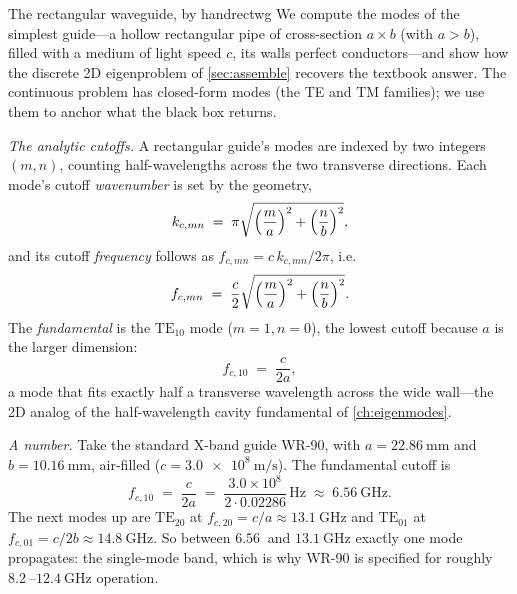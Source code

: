 \begin{workedexample}{The rectangular waveguide, by hand}{rectwg}
We compute the modes of the simplest guide---a hollow rectangular pipe of
cross-section $a\times b$ (with $a>b$), filled with a medium of light speed $c$,
its walls perfect conductors---and show how the discrete 2D eigenproblem of
\cref{sec:assemble} recovers the textbook answer. The continuous problem has
closed-form modes (the TE and TM families); we use them to anchor what the
black box returns.

\emph{The analytic cutoffs.} A rectangular guide's modes are indexed by two
integers $(m,n)$, counting half-wavelengths across the two transverse directions.
Each mode's cutoff \emph{wavenumber} is set by the geometry,
\[
  k_{c,mn} \;=\; \pi\sqrt{\Bigl(\frac{m}{a}\Bigr)^2 + \Bigl(\frac{n}{b}\Bigr)^2},
\]
and its cutoff \emph{frequency} follows as $f_{c,mn}=c\,k_{c,mn}/2\pi$, i.e.
\[
  f_{c,mn} \;=\; \frac{c}{2}\sqrt{\Bigl(\frac{m}{a}\Bigr)^2
                                 + \Bigl(\frac{n}{b}\Bigr)^2}.
\]
The \emph{fundamental} is the $\mathrm{TE}_{10}$ mode ($m=1,n=0$), the lowest
cutoff because $a$ is the larger dimension:
\[
  f_{c,10} \;=\; \frac{c}{2a},
\]
a mode that fits exactly half a transverse wavelength across the wide wall---the
2D analog of the half-wavelength cavity fundamental of \cref{ch:eigenmodes}.

\emph{A number.} Take the standard X-band guide WR-90, with
$a=\SI{22.86}{\milli\metre}$ and $b=\SI{10.16}{\milli\metre}$, air-filled
($c=\SI{3.0e8}{\metre\per\second}$). The fundamental cutoff is
\[
  f_{c,10} \;=\; \frac{c}{2a}
    \;=\; \frac{3.0\times10^8}{2\cdot 0.02286}\,\si{\hertz}
    \;\approx\; \SI{6.56}{\giga\hertz}.
\]
The next modes up are $\mathrm{TE}_{20}$ at $f_{c,20}=c/a\approx\SI{13.1}{\giga\hertz}$
and $\mathrm{TE}_{01}$ at $f_{c,01}=c/2b\approx\SI{14.8}{\giga\hertz}$. So between
$\SI{6.56}{}$ and $\SI{13.1}{\giga\hertz}$ exactly one mode propagates: the
single-mode band, which is why WR-90 is specified for roughly
$\SI{8.2}{}$--$\SI{12.4}{\giga\hertz}$ operation.


\end{workedexample}
